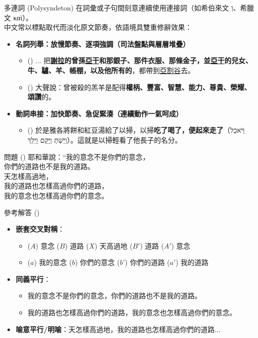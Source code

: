 \documentclass{beamer}
\begin{document}
\begin{frame}{多連詞 (Polysyndeton)}
  在詞彙或子句間刻意連續使用連接詞（如希伯來文 \texthebrew{וְ}、希臘文 \textgreek{καὶ}）。\\
  中文常以標點取代而淡化原文節奏，依語境具雙重修辭效果：
  \begin{itemize}
    \item\textbf{名詞列舉：放慢節奏、逐項強調（司法盤點與層層堆疊）}
      \begin{itemize}
        \item () $\dots$ 把\textbf{\uline{謝拉}的曾孫\uline{亞干}和那銀子、那件衣服、那條金子，並\uline{亞干}的兒女、牛、驢、羊、帳棚，以及他所有的}，都帶到\uline{亞割谷}去。
        \item () 大聲說：曾被殺的羔羊是配得\textbf{權柄、豐富、智慧、能力、尊貴、榮耀、頌讚}的。
      \end{itemize}
    \item\textbf{動詞串接：加快節奏、急促緊湊（連續動作一氣呵成）}
      \begin{itemize}
        \item () 於是雅各將餅和紅豆湯給了以掃，以掃\textbf{吃了喝了，便起來走了}（\texthebrew{וַיֹּאכַל וַיֵּשְׁתְּ וַיָּקָם וַיֵּלַךְ}）。這就是以掃輕看了他長子的名分。
      \end{itemize}
  \end{itemize}
\end{frame}

\begin{frame}{問題 ()}
  耶和華說：“我的意念不是你們的意念，\\
  你們的道路也不是我的道路。\\
  天怎樣高過地，\\
  我的道路也怎樣高過你們的道路，\\
  我的意念也怎樣高過你們的意念。\\
\end{frame}

\begin{frame}{參考解答 ()}
  \begin{itemize}
    \item\textbf{嵌套交叉對稱}：
      \begin{itemize}
        \item ($A$) 意念 ($B$) 道路 ($X$) 天高過地 ($B'$) 道路 ($A'$) 意念
        \item ($a$) 我的意念 ($b$) 你們的意念 ($b'$) 你們的道路 ($a'$) 我的道路
      \end{itemize}
    \item\textbf{同義平行}：
      \begin{itemize}
        \item 我的意念不是你們的意念，你們的道路也不是我的道路。
        \item 我的道路也怎樣高過你們的道路，我的意念也怎樣高過你們的意念。
      \end{itemize}
    \item\textbf{喻意平行/明喻}：天怎樣高過地，我的道路也怎樣高過你們的道路$\dots$
  \end{itemize}
\end{frame}
\end{document}
